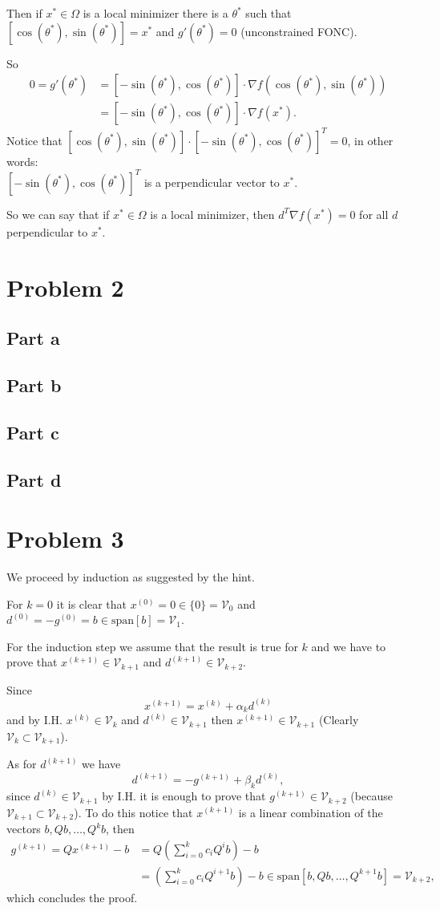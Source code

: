 \documentclass{article}
\begin{document}
Then if $x^*\in\Omega$ is a local minimizer there is a $\theta^*$ such
that\\
$[\cos(\theta^*),\sin(\theta^*)]=x^*$
and $g'(\theta^*)=0$ (unconstrained FONC).

So
\begin{align*}
0=
g'(\theta^*)
&=[-\sin(\theta^*),\cos(\theta^*)]\cdot
\nabla f(\cos(\theta^*),\sin(\theta^*))\\
&=[-\sin(\theta^*),\cos(\theta^*)]\cdot
\nabla f(x^*).
\end{align*}
Notice that
$[\cos(\theta^*),\sin(\theta^*)]\cdot[-\sin(\theta^*),\cos(\theta^*)]^T=0$, in
other words:\\
$[-\sin(\theta^*),\cos(\theta^*)]^T$ is a perpendicular vector to
$x^*$.

So we can say that if $x^*\in\Omega$ is a local minimizer, then $d^T\nabla
f(x^*)=0$ for all $d$ perpendicular to $x^*$.
\section*{Problem 2}
\subsection*{Part a}
\subsection*{Part b}
\subsection*{Part c}
\subsection*{Part d}
\section*{Problem 3}
We proceed by induction as suggested by the hint.

For $k=0$ it is clear that $x^{(0)}=0\in\{0\}=\mathcal{V}_0$ and
$d^{(0)}=-g^{(0)}=b\in \text{span}[b]=\mathcal{V}_1$.

For the induction step we assume that the result is true for $k$ and we have to
prove that $x^{(k+1)}\in \mathcal{V}_{k+1}$ and $d^{(k+1)}\in
\mathcal{V}_{k+2}$.

Since
\[
x^{(k+1)}=x^{(k)}+\alpha_kd^{(k)}
\]
and by I.H. $x^{(k)}\in \mathcal{V}_k$ and $d^{(k)}\in\mathcal{V}_{k+1}$ then
$x^{(k+1)}\in
\mathcal{V}_{k+1}$ (Clearly $\mathcal{V}_k\subset\mathcal{V}_{k+1}$).

As for $d^{(k+1)}$ we have
\[
d^{(k+1)}=-g^{(k+1)}+\beta_k d^{(k)},
\]
since $d^{(k)}\in\mathcal{V}_{k+1}$ by I.H. it is enough to prove that
$g^{(k+1)}\in\mathcal{V}_{k+2}$ (because
$\mathcal{V}_{k+1}\subset\mathcal{V}_{k+2}$). To do this notice that
$x^{(k+1)}$ is a linear combination of the vectors $b,Qb,\dots,Q^{k}b$, then
\begin{align*}
g^{(k+1)}=Qx^{(k+1)}-b&=Q\left(\sum_{i=0}^kc_iQ^ib\right) -b\\
&=\left(\sum_{i=0}^kc_iQ^{i+1}b\right)-b \in
\text{span}[b,Qb,\dots,Q^{k+1}b]=\mathcal{V}_{k+2},
\end{align*}
which concludes the proof.
\end{document}
